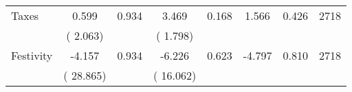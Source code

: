 \begin{tabular}{l*{7}{c}}
 Taxes       &              0.599       &        0.934  &              3.469       &        0.168  &              1.566       &              0.426 &  2718 \\ 
                       &       (       2.063)             &                               &       (       1.798)                     &                               &                                               &                                &                      \\ 

 Festivity       &             -4.157       &        0.934  &             -6.226       &        0.623  &             -4.797       &              0.810 &  2718 \\ 
                       &       (      28.865)             &                               &       (      16.062)                     &                               &                                               &                                &                      \\ 

\hline \end{tabular}